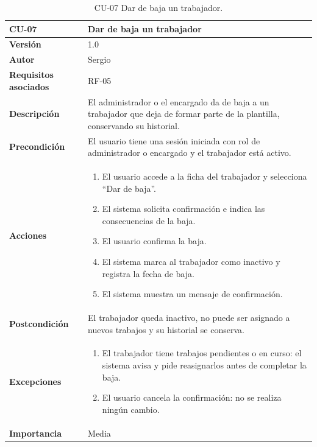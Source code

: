 \begin{table}[p]
	\centering
	\begin{tabularx}{\linewidth}{ p{} p{} }
		\toprule
		\textbf{CU-07}    & \textbf{Dar de baja un trabajador}\\
		\toprule
		\textbf{Versión}              & 1.0    \\
		\textbf{Autor}                & Sergio \\
		\textbf{Requisitos asociados} & RF-05 \\
		\textbf{Descripción}          & El administrador o el encargado da de baja a un trabajador que deja de formar parte de la plantilla, conservando su historial. \\
		\textbf{Precondición}         & El usuario tiene una sesión iniciada con rol de administrador o encargado y el trabajador está activo. \\
		\textbf{Acciones}             &
		\begin{enumerate}
			\def\labelenumi{\arabic{enumi}.}
			\tightlist
			\item El usuario accede a la ficha del trabajador y selecciona ``Dar de baja''.
			\item El sistema solicita confirmación e indica las consecuencias de la baja.
			\item El usuario confirma la baja.
			\item El sistema marca al trabajador como inactivo y registra la fecha de baja.
			\item El sistema muestra un mensaje de confirmación.
		\end{enumerate}\\
		\textbf{Postcondición}        & El trabajador queda inactivo, no puede ser asignado a nuevos trabajos y su historial se conserva. \\
		\textbf{Excepciones}          &
		\begin{enumerate}
			\def\labelenumi{\arabic{enumi}.}
			\tightlist
			\item El trabajador tiene trabajos pendientes o en curso: el sistema avisa y pide reasignarlos antes de completar la baja.
			\item El usuario cancela la confirmación: no se realiza ningún cambio.
		\end{enumerate}\\
		\textbf{Importancia}          & Media \\
		\bottomrule
	\end{tabularx}
	\caption{CU-07 Dar de baja un trabajador.}
\end{table}

